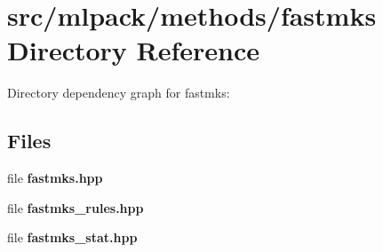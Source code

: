 \section{src/mlpack/methods/fastmks Directory Reference}
\label{dir_96fa7d6fbc149092dffd1d00edd87548}
Directory dependency graph for fastmks\-:
\subsection*{Files}
\begin{DoxyCompactItemize}
\item 
file {\bf fastmks.\-hpp}
\item 
file {\bf fastmks\-\_\-rules.\-hpp}
\item 
file {\bf fastmks\-\_\-stat.\-hpp}
\end{DoxyCompactItemize}
